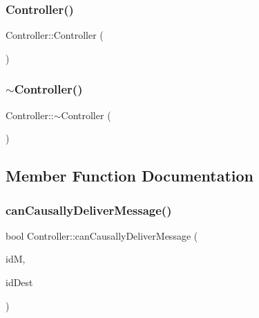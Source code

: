 \subsubsection{\texorpdfstring{Controller()}{Controller()}}
{\footnotesize\ttfamily Controller\+::\+Controller (\begin{DoxyParamCaption}{ }\end{DoxyParamCaption})}

\mbox{\label{class_controller_a0ab87934c4f7a266cfdb86e0f36bc1b5}} 
\subsubsection{\texorpdfstring{$\sim$\+Controller()}{~Controller()}}
{\footnotesize\ttfamily Controller\+::$\sim$\+Controller (\begin{DoxyParamCaption}{ }\end{DoxyParamCaption})\hspace{0.3cm}{\ttfamily [virtual]}}



\subsection{Member Function Documentation}
\mbox{\label{class_controller_ab57c4459f002be63b4deda1d7c3c3e29}} 
\subsubsection{\texorpdfstring{can\+Causally\+Deliver\+Message()}{canCausallyDeliverMessage()}}
{\footnotesize\ttfamily bool Controller\+::can\+Causally\+Deliver\+Message (\begin{DoxyParamCaption}\item[{\hyperlink{structures_8h_a83a1d9a070efa5341da84cfd8e28d3e5}{id\+Msg}}]{idM,  }\item[{unsigned int}]{id\+Dest }\end{DoxyParamCaption})}

\mbox{\label{class_controller_ab250759d5c511ceb8f35fdf9e42583cd}} 
